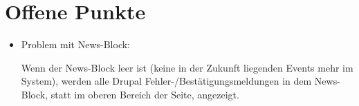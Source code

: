 \section{Offene Punkte}
\begin{itemize}
	\item Problem mit News-Block:
	
	Wenn der News-Block leer ist (keine in der Zukunft liegenden Events mehr im System), werden alle Drupal Fehler-/Bestätigungsmeldungen in dem News-Block, statt im oberen Bereich der Seite, angezeigt.
	

\end{itemize}

\printglossary[title = Glossar]

%
